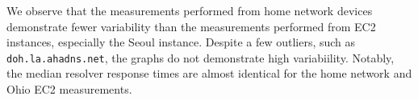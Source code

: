 We observe that the measurements performed from home network devices 
demonstrate fewer variability than the measurements performed from EC2 instances, 
especially the Seoul instance. Despite a few outliers, such as \texttt{doh.la.ahadns.net}, 
the graphs do not demonstrate high variabiility. Notably, the median resolver response 
times are almost identical for the home network and Ohio EC2 measurements. 

\begin{figure}[t!]
\hfill%
%
\hfill%
%
\hfill%
%

\end{figure}
